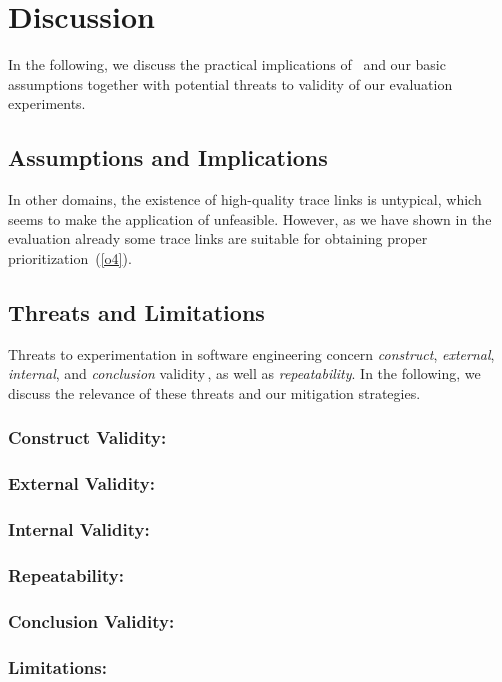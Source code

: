 \section{Discussion}\label{sec:disc}

In the following, we discuss the practical implications of \appr\ and our basic assumptions together with potential threats to validity of our evaluation experiments.

\subsection{Assumptions and Implications}
\label{sec:implication}
In other domains, the existence of high-quality trace links is untypical, which seems to make the application of \appr{} unfeasible.
However, as we have shown in the evaluation already some trace links are suitable for obtaining proper prioritization~(\ref{o4}).

\subsection{Threats and Limitations}
\label{sec:threats}

Threats to experimentation in software engineering concern \emph{construct}, \emph{external}, \emph{internal}, and \emph{conclusion} validity\,\citep{Jedlitschka2008RES}, as well as \emph{repeatability}.
In the following, we discuss the relevance of these threats and our mitigation strategies.

\subsubsection{Construct Validity:}

\subsubsection{External Validity:}

\subsubsection{Internal Validity:}

\subsubsection{Repeatability:}

\subsubsection{Conclusion Validity:}

\subsubsection{Limitations:}
